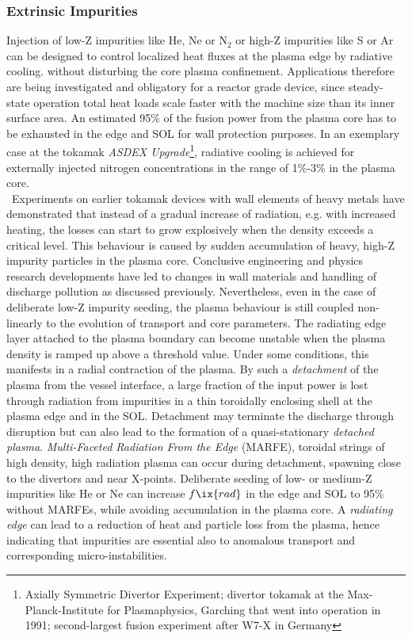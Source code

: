             \subsubsection*{Extrinsic Impurities}%
%
                Injection of low-Z impurities like He, Ne or N$_{2}$ or high-Z impurities like S or Ar can be designed to control localized heat fluxes at the plasma edge by radiative cooling. without disturbing the core plasma confinement. Applications therefore are being investigated and obligatory for a reactor grade device, since steady-state operation total heat loads scale faster with the machine size than its inner surface area. An estimated 95\% of the fusion power from the plasma core has to be exhausted in the edge and SOL for wall protection purposes. In an exemplary case at the tokamak \textit{ASDEX Upgrade}\footnote[1]{Axially Symmetric Divertor Experiment; divertor tokamak at the Max-Planck-Institute for Plasmaphysics, Garching that went into operation in 1991; second-largest fusion experiment after W7-X in Germany}, radiative cooling is achieved for externally injected nitrogen concentrations in the range of 1\%-3\% in the plasma core.\cite{Dux1996,Kallenbach2009,Kallenbach2011,Kallenbach2012,Casson2015}\\%
%
            \,\newline%
            Experiments on earlier tokamak devices with wall elements of heavy metals have demonstrated that instead of a gradual increase of radiation, e.g. with increased heating, the losses can start to grow explosively when the density exceeds a critical level. This behaviour is caused by sudden accumulation of heavy, high-Z impurity particles in the plasma core. Conclusive engineering and physics research developments have led to changes in wall materials and handling of discharge pollution as discussed previously. Nevertheless, even in the case of deliberate low-Z impurity seeding, the plasma behaviour is still coupled non-linearly to the evolution of transport and core parameters. The radiating edge layer attached to the plasma boundary can become unstable when the plasma density is ramped up above a threshold value. Under some conditions, this manifests in a radial contraction of the plasma. By such a \textit{detachment} of the plasma from the vessel interface, a large fraction of the input power is lost through radiation from impurities in a thin toroidally enclosing shell at the plasma edge and in the SOL. Detachment may terminate the discharge through disruption but can also lead to the formation of a quasi-stationary \textit{detached plasma}. \textit{Multi-Faceted Radiation From the Edge} (MARFE), toroidal strings of high density, high radiation plasma can occur during detachment, spawning close to the divertors and near X-points\cite{Wenzel2018}. Deliberate seeding of low- or medium-Z impurities like He or Ne can increase $f\ix{rad}$ in the edge and SOL to 95\% without MARFEs, while avoiding accumulation in the plasma core. A \textit{radiating edge} can lead to a reduction of heat and particle loss from the plasma, hence indicating that impurities are essential also to anomalous transport and corresponding micro-instabilities.\cite{Baker1982,Greenwald2002,Lipschultz1984}\\%
%
